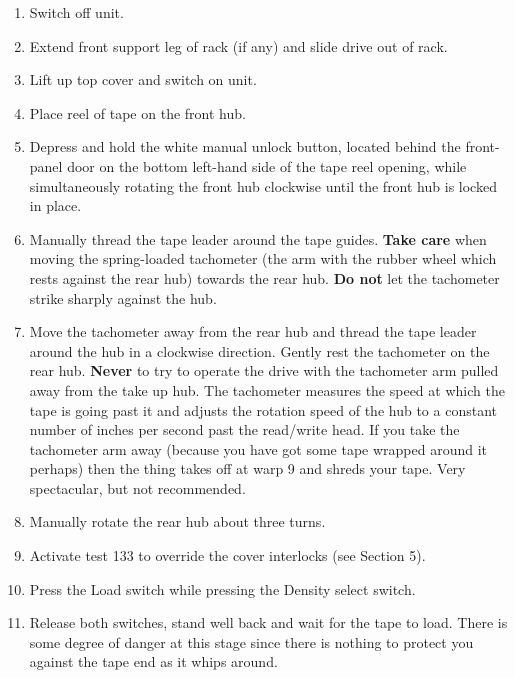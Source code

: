 \begin{enumerate}

\item Switch off unit.

\item Extend front support leg of rack (if any) and slide drive out of rack.

\item Lift up top cover and switch on unit.

\item Place reel of tape on the front hub.

\item Depress and hold the white manual unlock button, located behind the
front-panel door on the bottom left-hand side of the tape reel opening,
while simultaneously rotating the front hub clockwise until the front hub is locked
in place.

\item Manually thread the tape leader around the tape guides. {\bf Take care} 
when moving the spring-loaded tachometer (the arm with the rubber wheel which
rests against the rear hub) towards the rear hub. {\bf Do not} let the
tachometer strike sharply against the hub.

\item Move the tachometer away from the rear hub and thread the tape 
leader around the hub in a clockwise direction. Gently rest the tachometer on
the rear hub.
{\bf Never} to try to operate the
drive with the tachometer arm  pulled away from the take up hub. The tachometer
measures the speed at which the tape is going past it and adjusts the rotation
speed of the hub to a constant number of inches per second past the read/write
head. If you take the tachometer arm away (because you have got some tape
wrapped around it perhaps) then the thing takes off at warp 9 and shreds your
tape. Very spectacular, but not recommended.

\item Manually rotate the rear hub about three turns.

\item Activate test 133 to override the cover interlocks (see Section 5).

\item Press the Load switch while pressing the Density select switch.

\item Release both switches, stand well back and wait for the tape to load.
There is some degree of danger at this stage since there
is nothing to protect you against the tape end as it whips around.
                                                                     

\end{enumerate}

